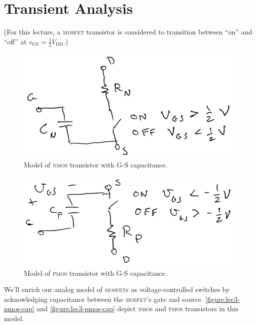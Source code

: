 \chapter{Transient Analysis}
(For this lecture, a \textsc{mosfet} transistor is considered to transition between ``on'' and ``off'' at \(v_\text{GS} = \frac{1}{2} V_\text{DD}\).)

\begin{figure}
  \centering
  \includegraphics[width=0.75\linewidth]{figures/3/nmos-cap}
  \caption{Model of \textsc{nmos} transistor with G-S capacitance.}
  \label{figure:lec3-nmos-cap}
\end{figure}
\begin{figure}
  \centering
  \includegraphics[width=0.75\linewidth]{figures/3/pmos-cap}
  \caption{Model of \textsc{pmos} transistor with G-S capacitance.}
  \label{figure:lec3-pmos-cap}
\end{figure}
We'll enrich our analog model of \textsc{mosfet}s as voltage-controlled switches by acknowledging capacitance between the \textsc{mosfet}'s gate and source.
\autoref{figure:lec3-nmos-cap} and \autoref{figure:lec3-pmos-cap}
depict \textsc{nmos} and \textsc{pmos} transistors in this model.

